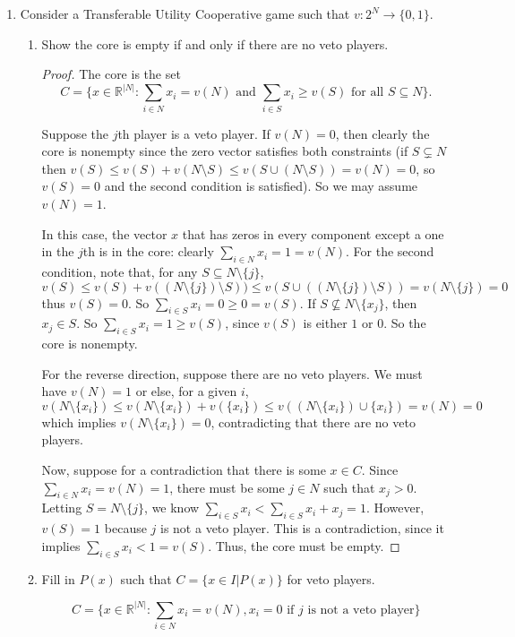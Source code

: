 \documentclass[10pt]{article}
\newcommand{\R}{\mathbb{R}}
\begin{document}
\begin{enumerate}
\item Consider a Transferable Utility Cooperative game such that $v:2^N \rightarrow \{0,1\}$.
\begin{enumerate}
\item Show the core is empty if and only if there are no veto players.
\begin{proof}
The core is the set $$C = \{ x \in \R^{|N|} : \sum_{i \in N} x_i = v(N) \text{ and } \sum_{i \in S} x_i \geq v(S) \text{ for all } S \subseteq N \}.$$

Suppose the $j$th player is a veto player.  If $v(N) = 0$, then clearly the core is nonempty since the zero vector satisfies both constraints (if $S \subsetneq N$ then $v(S) \leq v(S) + v(N \setminus S) \leq v(S \cup (N \setminus S)) = v(N) = 0$, so $v(S) = 0$ and the second condition is satisfied).  So we may assume $v(N) = 1$.

In this case, the vector $x$ that has zeros in every component except a one in the $j$th is in the core: clearly $\sum_{i \in N} x_i = 1 = v(N)$.  For the second condition, note that, for any $S \subseteq N \setminus \{j\}$,
$$v(S) \leq v(S) + v((N \setminus \{j\}) \setminus S)) \leq v(S \cup ((N \setminus \{j\}) \setminus S)) = v(N \setminus \{j\}) = 0$$ thus $v(S) = 0$.  So $\sum_{i \in S} x_i = 0 \geq 0 = v(S)$.   If $S \not \subseteq N \setminus \{x_j\}$, then $x_j \in S$.  So $\sum_{i \in S} x_i = 1 \geq v(S)$, since $v(S)$ is either $1$ or $0$.  So the core is nonempty.

For the reverse direction, suppose there are no veto players.  We must have $v(N) = 1$ or else, for a given $i$, $$v(N \setminus \{x_i\}) \leq v(N \setminus \{x_i\}) + v(\{x_i\}) \leq v((N \setminus \{x_i\}) \cup \{x_i\}) = v(N) = 0$$ which implies $v(N \setminus \{x_i\}) = 0$, contradicting that there are no veto players.

Now, suppose for a contradiction that there is some $x \in C$.  Since $\sum_{i \in N} x_i = v(N) = 1$, there must be some $j \in N$ such that $x_j > 0$.  Letting $S = N \setminus \{j\}$, we know $\sum_{i \in S} x_i < \sum_{i \in S} x_i + x_j = 1$.  However, $v(S) = 1$ because $j$ is not a veto player.  This is a contradiction, since it implies $\sum_{i \in S} x_i  < 1 = v(S)$.  Thus, the core must be empty.
\end{proof}
\item Fill in $P(x)$ such that $C = \{x \in I | P(x) \}$ for veto players.

$$C = \{x \in \R^{|N|} : \sum_{i \in N} x_i = v(N), x_i = 0 \text{ if } j \text{ is not a veto player} \}$$


\end{enumerate}
\end{enumerate}
\end{document}
